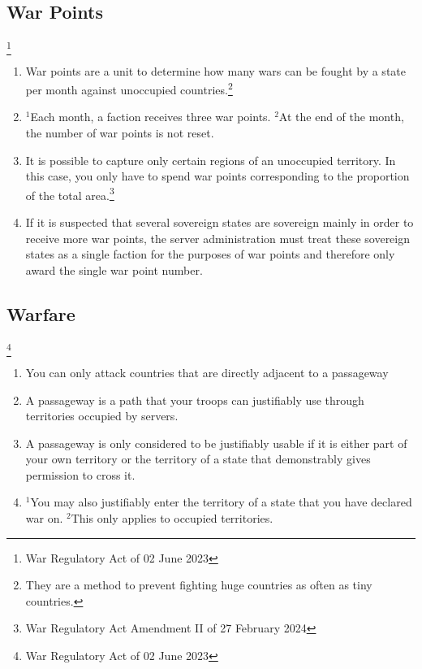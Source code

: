 \documentclass{article}
\newcommand{\sent}[1]{$^{#1}$}
\begin{document}
\subsection{War Points}\footnote{War Regulatory Act of 02 June 2023}
\begin{enumerate}[(1)]
	\item War points are a unit to determine how many wars can be fought by a state per month against unoccupied countries.\footnote{They are a method to prevent fighting huge countries as often as tiny countries.}
	\item \sent{1}Each month, a faction receives three war points. \sent{2}At the end of the month, the number of war points is not reset. %
	\item It is possible to capture only certain regions of an unoccupied territory. In this case, you only have to spend war points corresponding to the proportion of the total area.\footnote{War Regulatory Act Amendment II of 27 February 2024}
	\item If it is suspected that several sovereign states are sovereign mainly in order to receive more war points, the server administration must treat these sovereign states as a single faction for the purposes of war points and therefore only award the single war point number. %
\end{enumerate}

\subsection{Warfare}\footnote{War Regulatory Act of 02 June 2023}
\begin{enumerate}[(1)]
	\item You can only attack countries that are directly adjacent to a passageway
	\item A passageway is a path that your troops can justifiably use through territories occupied by servers.
	\item A passageway is only considered to be justifiably usable if it is either part of your own territory or the territory of a state that demonstrably gives permission to cross it.
	\item \sent{1}You may also justifiably enter the territory of a state that you have declared war on. \sent{2}This only applies to occupied territories.
\end{enumerate}
\end{document}

